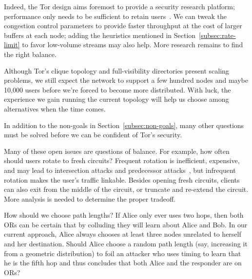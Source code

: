\documentclass[times,10pt,twocolumn]{article}
\begin{document}
Indeed, the Tor
design aims foremost to provide a security research platform; performance
only needs to be sufficient to retain users~\cite{econymics,back01}.
We can tweak the congestion control
parameters to provide faster throughput at the cost of
larger buffers at each node; adding the heuristics mentioned in
Section~\ref{subsec:rate-limit} to favor low-volume
streams may also help. More research remains to find the
right balance.


Although Tor's clique topology and full-visibility directories present
scaling problems, we still expect the network to support a few hundred
nodes and maybe 10,000 users before we're forced to become
more distributed. With luck, the experience we gain running the current
topology will help us choose among alternatives when the time comes.

\label{sec:maintaining-anonymity}

In addition to the non-goals in
Section~\ref{subsec:non-goals}, many other questions must be solved
before we can be confident of Tor's security.

Many of these open issues are questions of balance. For example,
how often should users rotate to fresh circuits? Frequent rotation
is inefficient, expensive, and may lead to intersection attacks and
predecessor attacks~\cite{wright03}, but infrequent rotation makes the
user's traffic linkable. Besides opening fresh circuits, clients can
also exit from the middle of the circuit,
or truncate and re-extend the circuit. More analysis is
needed to determine the proper tradeoff.

%

How should we choose path lengths? If Alice only ever uses two hops,
then both ORs can be certain that by colluding they will learn about
Alice and Bob. In our current approach, Alice always chooses at least
three nodes unrelated to herself and her destination.
%
Should Alice choose a random path length (say,
increasing it from a geometric distribution) to foil an attacker who
uses timing to learn that he is the fifth hop and thus concludes that
both Alice and the responder are on ORs?
\end{document}
